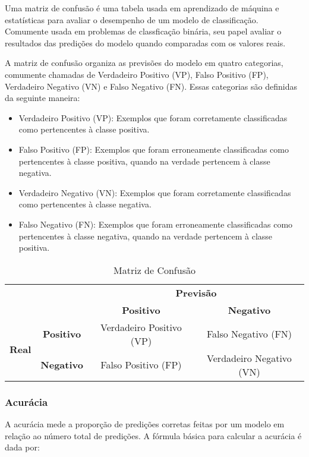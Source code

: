 Uma matriz de confusão é uma tabela usada em aprendizado de máquina e estatísticas para avaliar o 
desempenho de um modelo de classificação. Comumente usada em problemas de classficação binária, seu papel 
avaliar o resultados das predições do modelo quando comparadas com os valores reais.

A matriz de confusão organiza as previsões do modelo em quatro categorias, comumente chamadas de Verdadeiro Positivo (VP), 
Falso Positivo (FP), Verdadeiro Negativo (VN) e Falso Negativo (FN). Essas categorias são definidas da seguinte maneira:

\begin{itemize}
  \item Verdadeiro Positivo (VP): Exemplos que foram corretamente classificadas como pertencentes à classe positiva.
  \item Falso Positivo (FP): Exemplos que foram erroneamente classificadas como pertencentes à classe positiva, quando na verdade pertencem à classe negativa.
  \item Verdadeiro Negativo (VN): Exemplos que foram corretamente classificadas como pertencentes à classe negativa. 
  \item Falso Negativo (FN): Exemplos que foram erroneamente classificadas como pertencentes à classe negativa, quando na verdade pertencem à classe positiva.
\end{itemize}

\begin{table}[h]
  \centering
  \begin{tabular}{c|c|c|c|}
  & & \multicolumn{2}{c|}{\textbf{Previsão}} \\ \cline{3-4}
  & & \textbf{Positivo} & \textbf{Negativo} \\ \hline
  \multicolumn{1}{|c|}{\multirow{2}{*}{\textbf{Real}}} & \textbf{Positivo} & Verdadeiro Positivo (VP) & Falso Negativo (FN) \\ \cline{2-4}
  \multicolumn{1}{|c|}{} & \textbf{Negativo} & Falso Positivo (FP) & Verdadeiro Negativo (VN) \\ \hline
  \end{tabular}
  \caption{Matriz de Confusão}
  \label{table:confusion_matrix}
\end{table}

\subsubsection{Acurácia}
A acurácia mede a proporção de predições corretas feitas por um modelo em relação ao número total de predições. 
A fórmula básica para calcular a acurácia é dada por:

